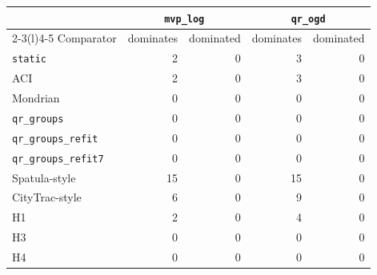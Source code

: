 \setlength{\tabcolsep}{3pt}
\begin{tabular}{@{}lrrrr@{}}
\toprule
 & \multicolumn{2}{c}{\texttt{mvp\_log}} & \multicolumn{2}{c}{\texttt{qr\_ogd}} \\
\cmidrule(lr){2-3}\cmidrule(l){4-5}
Comparator & dominates & dominated & dominates & dominated \\
\midrule
\texttt{static} & 2 & 0 & 3 & 0 \\
ACI & 2 & 0 & 3 & 0 \\
Mondrian & 0 & 0 & 0 & 0 \\
\texttt{qr\_groups} & 0 & 0 & 0 & 0 \\
\texttt{qr\_groups\_refit} & 0 & 0 & 0 & 0 \\
\texttt{qr\_groups\_refit7} & 0 & 0 & 0 & 0 \\
Spatula-style & 15 & 0 & 15 & 0 \\
CityTrac-style & 6 & 0 & 9 & 0 \\
H1 & 2 & 0 & 4 & 0 \\
H3 & 0 & 0 & 0 & 0 \\
H4 & 0 & 0 & 0 & 0 \\
\bottomrule
\end{tabular}
